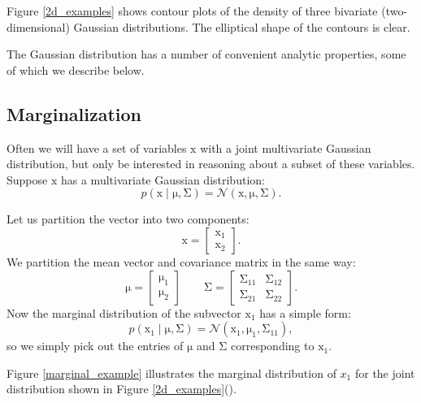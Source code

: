 \documentclass{article}
\newcommand{\given}{\mid}
\newcommand{\mc}[1]{\mathcal{#1}}
\newcommand{\mat}[1]{\bm{\mathrm{#1}}}
\renewcommand{\vec}[1]{\bm{\mathrm{#1}}}
\begin{document}
Figure \ref{2d_examples} shows contour plots of the density of three
bivariate (two-dimensional) Gaussian distributions.  The elliptical
shape of the contours is clear.

The Gaussian distribution has a number of convenient analytic
properties, some of which we describe below.

\subsection*{Marginalization}

Often we will have a set of variables $\vec{x}$ with a joint
multivariate Gaussian distribution, but only be interested in
reasoning about a subset of these variables.  Suppose $\vec{x}$
has a multivariate Gaussian distribution:
\begin{equation*}
  p(\vec{x} \given \vec{\mu}, \mat{\Sigma})
  =
  \mc{N}(\vec{x}, \vec{\mu}, \mat{\Sigma}).
\end{equation*}

Let us partition the vector into two components:
\begin{equation*}
  \vec{x}
  =
  \begin{bmatrix}
    \vec{x}_1 \\
    \vec{x}_2
  \end{bmatrix}.
\end{equation*}
We partition the mean vector and covariance matrix in the same
way:
\begin{equation*}
  \vec{\mu}
  =
  \begin{bmatrix}
    \vec{\mu}_1 \\
    \vec{\mu}_2
  \end{bmatrix}
  \qquad
  \mat{\Sigma}
  =
  \begin{bmatrix}
    \mat{\Sigma}_{11} & \mat{\Sigma}_{12} \\
    \mat{\Sigma}_{21} & \mat{\Sigma}_{22}
  \end{bmatrix}.
\end{equation*}
Now the marginal distribution of the subvector $\vec{x}_1$
has a simple form:
\begin{equation*}
  p(\vec{x}_1 \given \vec{\mu}, \mat{\Sigma})
  =
  \mc{N}(\vec{x}_1, \vec{\mu}_1, \mat{\Sigma}_{11}),
\end{equation*}
so we simply pick out the entries of $\vec{\mu}$ and $\mat{\Sigma}$
corresponding to $\vec{x}_1$.

Figure \ref{marginal_example} illustrates the marginal distribution of
$x_1$ for the joint distribution shown in Figure
\ref{2d_examples}().
\end{document}
